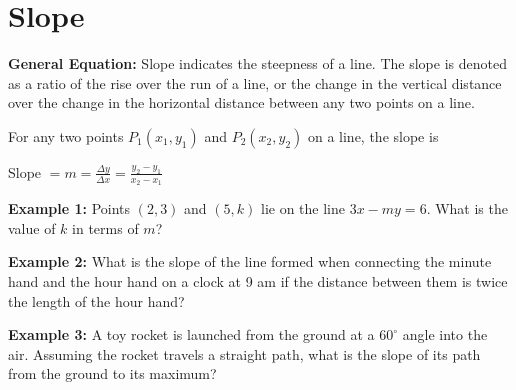 \section{Slope}

\textbf{General Equation:} Slope indicates the steepness of a line. The slope is denoted as a ratio of the rise over the run of a line, or the change in the vertical distance over the change in the horizontal distance between any two points on a line.

\bigskip
For any two points $P_1(x_1,y_1)$ and $P_2(x_2,y_2)$ on a line, the slope is

\begin{center}
Slope $= m = \frac{\Delta y}{\Delta x}=\frac{y_2-y_1}{x_2-x_1}$
\end{center}

\vfill\textbf{Example 1:} Points $(2,3)$ and $(5,k)$ lie on the line $3x-my=6$. What is the value of $k$ in terms of $m$?

\vfill\textbf{Example 2:} What is the slope of the line formed when connecting the minute hand and the hour hand on a clock at 9 am if the distance between them is twice the length of the hour hand?

\vfill\textbf{Example 3:} A toy rocket is launched from the ground at a $60^\circ$ angle into the air. Assuming the rocket travels a straight path, what is the slope of its path from the ground to its maximum?

